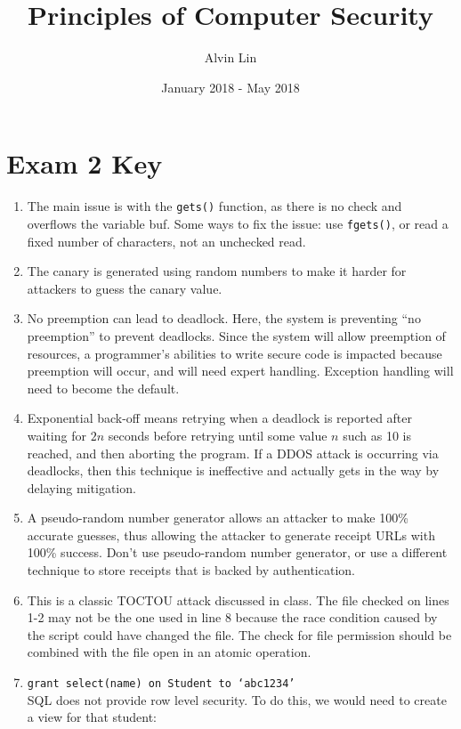 \documentclass{math}
\title{Principles of Computer Security}
\author{Alvin Lin}
\date{January 2018 - May 2018}
\begin{document}
\maketitle

\section*{Exam 2 Key}
\begin{enumerate}
  \item The main issue is with the \texttt{gets()} function, as there is no
  check and overflows the variable buf. Some ways to fix the issue: use
  \texttt{fgets()}, or read a fixed number of characters, not an unchecked read.
  \item The canary is generated using random numbers to make it harder for
  attackers to guess the canary value.
  \item No preemption can lead to deadlock. Here, the system is preventing
  ``no preemption'' to prevent deadlocks. Since the system will allow
  preemption of resources, a programmer's abilities to write secure code is
  impacted because preemption will occur, and will need expert handling.
  Exception handling will need to become the default.
  \item Exponential back-off means retrying when a deadlock is reported after
  waiting for \( 2n \) seconds before retrying until some value \( n \) such as
  10 is reached, and then aborting the program. If a DDOS attack is occurring
  via deadlocks, then this technique is ineffective and actually gets in the way
  by delaying mitigation.
  \item A pseudo-random number generator allows an attacker to make 100\%
  accurate guesses, thus allowing the attacker to generate receipt URLs with
  100\% success. Don't use pseudo-random number generator, or use a different
  technique to store receipts that is backed by authentication.
  \item This is a classic TOCTOU attack discussed in class. The file checked
  on lines 1-2 may not be the one used in line 8 because the race condition
  caused by the script could have changed the file. The check for file
  permission should be combined with the file open in an atomic operation.
  \item \texttt{grant select(name) on Student to `abc1234'} \\
  SQL does not provide row level security. To do this, we would need to create
  a view for that student: \\

\end{enumerate}
\end{document}
